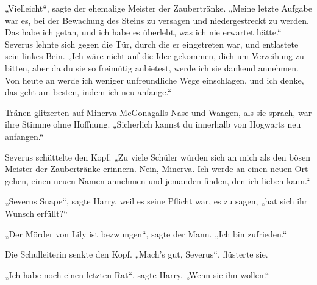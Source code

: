 „Vielleicht“, sagte der ehemalige Meister der Zaubertränke.
„Meine letzte Aufgabe war es, bei der Bewachung des Steins zu versagen und niedergestreckt zu werden. Das habe ich getan, und ich habe es überlebt, was ich nie erwartet hätte.“ Severus lehnte sich gegen die Tür, durch die er eingetreten war, und entlastete sein linkes Bein.
„Ich wäre nicht auf die Idee gekommen, dich um Verzeihung zu bitten, aber da du sie so freimütig anbietest, werde ich sie dankend annehmen. Von heute an werde ich weniger unfreundliche Wege einschlagen, und ich denke, das geht am besten, indem ich neu anfange.“

Tränen glitzerten auf Minerva McGonagalls Nase und Wangen, als sie sprach, war ihre Stimme ohne Hoffnung.
„Sicherlich kannst du innerhalb von Hogwarts neu anfangen.“

Severus schüttelte den Kopf.
„Zu viele Schüler würden sich an mich als den bösen Meister der Zaubertränke erinnern. Nein, Minerva. Ich werde an einen neuen Ort gehen, einen neuen Namen annehmen und jemanden finden, den ich lieben kann.“

„Severus Snape“, sagte Harry, weil es seine Pflicht war, es zu sagen, „hat sich ihr Wunsch erfüllt?“

„Der Mörder von Lily ist bezwungen“, sagte der Mann.
„Ich bin zufrieden.“

Die Schulleiterin senkte den Kopf.
„Mach’s gut, Severus“, flüsterte sie.

„Ich habe noch einen letzten Rat“, sagte Harry.
„Wenn sie ihn wollen.“


